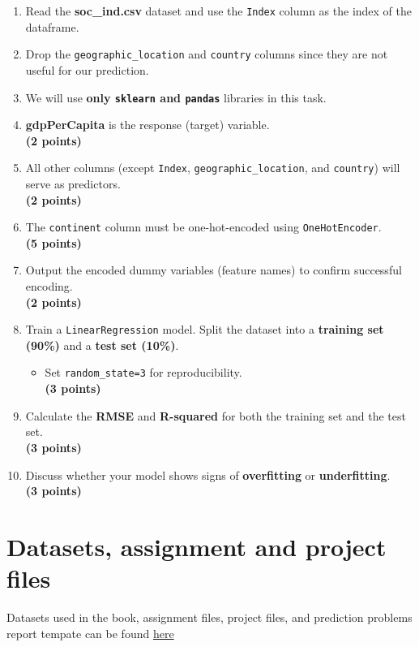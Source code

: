 \documentclass[
  letterpaper,
  DIV=11,
  numbers=noendperiod]{scrreprt}
\providecommand{\tightlist}{%
  \setlength{\itemsep}{0pt}\setlength{\parskip}{0pt}}\usepackage{longtable,booktabs,array}
\begin{document}
\begin{enumerate}
\def\labelenumi{\arabic{enumi}.}
\tightlist
\item
  Read the \textbf{soc\_ind.csv} dataset and use the \texttt{Index}
  column as the index of the dataframe.
\item
  Drop the \texttt{geographic\_location} and \texttt{country} columns
  since they are not useful for our prediction.
\item
  We will use \textbf{only \texttt{sklearn} and \texttt{pandas}}
  libraries in this task.
\item
  \textbf{gdpPerCapita} is the response (target) variable.\\
  \textbf{(2 points)}\\
\item
  All other columns (except \texttt{Index},
  \texttt{geographic\_location}, and \texttt{country}) will serve as
  predictors.\\
  \textbf{(2 points)}\\
\item
  The \texttt{continent} column must be one-hot-encoded using
  \texttt{OneHotEncoder}.\\
  \textbf{(5 points)}
\item
  Output the encoded dummy variables (feature names) to confirm
  successful encoding.\\
  \textbf{(2 points)}\\
\item
  Train a \texttt{LinearRegression} model. Split the dataset into a
  \textbf{training set (90\%)} and a \textbf{test set (10\%)}.

  \begin{itemize}
  \tightlist
  \item
    Set \texttt{random\_state=3} for reproducibility.\\
    \textbf{(3 points)}\\
  \end{itemize}
\item
  Calculate the \textbf{RMSE} and \textbf{R-squared} for both the
  training set and the test set.\\
  \textbf{(3 points)}\\
\item
  Discuss whether your model shows signs of \textbf{overfitting} or
  \textbf{underfitting}.\\
  \textbf{(3 points)}
\end{enumerate}

\chapter{Datasets, assignment and project
files}\label{datasets-assignment-and-project-files}

Datasets used in the book, assignment files, project files, and
prediction problems report tempate can be found
\href{https://nuwildcat-my.sharepoint.com/:f:/g/personal/lsi8012_ads_northwestern_edu/EoCM59cBQ4NIqFpdDS_LwXgBRZul47opYaNpWvd9dGD6Ag?e=nqJSzq}{here}
\end{document}
